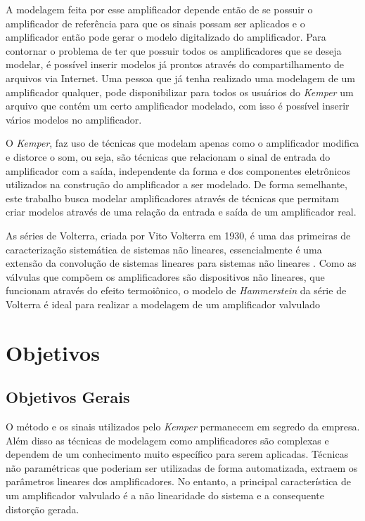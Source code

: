 A modelagem feita por esse amplificador depende então de se possuir o amplificador de referência para que os sinais possam ser aplicados e o amplificador então pode gerar o modelo digitalizado do amplificador. Para contornar o problema de ter que possuir todos os amplificadores que se deseja modelar, é possível inserir modelos já prontos através do compartilhamento de arquivos via Internet. Uma pessoa que já tenha realizado uma modelagem de um amplificador qualquer, pode disponibilizar para todos os usuários do \textit{Kemper} um arquivo que contém um certo amplificador modelado, com isso é possível inserir vários modelos no amplificador.

O \textit{Kemper}, faz uso de técnicas que modelam apenas como o amplificador modifica e distorce o som, ou seja, são técnicas que relacionam o sinal de entrada do amplificador com a saída, independente da forma e dos componentes eletrônicos utilizados na construção do amplificador a ser modelado. De forma semelhante, este trabalho busca modelar amplificadores através de técnicas que permitam criar modelos através de uma relação da entrada e saída de um amplificador real.

As séries de Volterra, criada por Vito Volterra em 1930, é uma das primeiras de caracterização sistemática de sistemas não lineares, essencialmente é uma extensão da convolução de sistemas lineares para sistemas não lineares \cite{cheng2017volterra}. Como as válvulas que compõem os amplificadores são dispositivos não lineares, que funcionam através do efeito termoiônico, o modelo de \textit{Hammerstein} da série de Volterra é ideal para realizar a modelagem de um amplificador valvulado






\section*{Objetivos}
\subsection*{Objetivos Gerais}
O método e os sinais utilizados pelo \textit{Kemper} permanecem em segredo da empresa. Além disso as técnicas de modelagem como amplificadores são complexas e dependem de um conhecimento muito específico para serem aplicadas. Técnicas não paramétricas que poderiam ser utilizadas de forma automatizada, extraem os parâmetros lineares dos amplificadores. No entanto, a principal característica de um amplificador valvulado é a não linearidade do sistema e a consequente distorção gerada.

